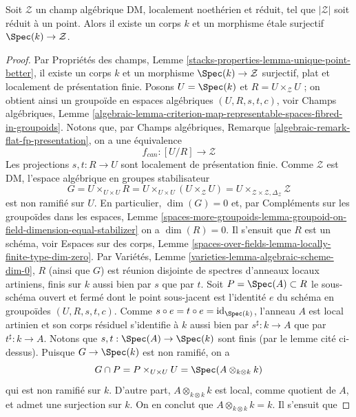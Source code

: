 \begin{lemma}
\label{lemma-DM-residual-gerbe}
Soit $\mathcal{Z}$ un champ algébrique DM, localement noethérien et réduit,
tel que $|\mathcal{Z}|$ soit réduit à un point. Alors il existe un corps $k$
et un morphisme étale surjectif $\Spec(k) \to \mathcal{Z}$.
\end{lemma}

\begin{proof}
Par Propriétés des champs,
Lemme \ref{stacks-properties-lemma-unique-point-better},
il existe un corps $k$ et un morphisme $\Spec(k) \to \mathcal{Z}$ surjectif,
plat et localement de présentation finie. Posons $U = \Spec(k)$ et
$R = U \times_\mathcal{Z} U$ ; on obtient ainsi un groupoïde en espaces
algébriques $(U, R, s, t, c)$, voir Champs algébriques, Lemme
\ref{algebraic-lemma-criterion-map-representable-spaces-fibred-in-groupoids}.
Notons que, par Champs algébriques,
Remarque \ref{algebraic-remark-flat-fp-presentation}, on a une équivalence
$$
f_{can} : [U/R] \longrightarrow \mathcal{Z}
$$
Les projections $s, t : R \to U$ sont localement de présentation finie.
Comme $\mathcal{Z}$ est DM, l'espace algébrique en groupes stabilisateur
$$
G = U \times_{U \times U} R = U \times_{U \times U} (U \times_\mathcal{Z} U) =
U \times_{\mathcal{Z} \times \mathcal{Z}, \Delta_\mathcal{Z}} \mathcal{Z}
$$
est non ramifié sur $U$. En particulier, $\dim(G) = 0$ et, par Compléments
sur les groupoïdes dans les espaces, Lemme
\ref{spaces-more-groupoids-lemma-groupoid-on-field-dimension-equal-stabilizer}
on a $\dim(R) = 0$. Il s'ensuit que $R$ est un schéma, voir Espaces sur des
corps, Lemme
\ref{spaces-over-fields-lemma-locally-finite-type-dim-zero}.
Par Variétés, Lemme \ref{varieties-lemma-algebraic-scheme-dim-0},
$R$ (ainsi que $G$) est réunion disjointe de spectres d'anneaux locaux
artiniens, finis sur $k$ aussi bien par $s$ que par $t$. Soit
$P = \Spec(A) \subset R$ le sous-schéma ouvert et fermé dont le point
sous-jacent est l'identité $e$ du schéma en groupoïdes $(U, R, s, t, c)$.
Comme $s \circ e = t \circ e = \text{id}_{\Spec(k)}$, l'anneau $A$ est local
artinien et son corps résiduel s'identifie à $k$ aussi bien par
$s^\sharp : k \to A$ que par $t^\sharp : k \to A$.
Notons que $s, t : \Spec(A) \to \Spec(k)$ sont finis (par le lemme cité
ci-dessus). Puisque $G \to \Spec(k)$ est non ramifié, on a
$$
G \cap P = P \times_{U \times U} U = \Spec(A \otimes_{k \otimes k} k)
$$
qui est non ramifié sur $k$. D'autre part,
$A \otimes_{k \otimes k} k$ est local, comme quotient de $A$, et admet une
surjection sur $k$. On en conclut que $A \otimes_{k \otimes k} k = k$. Il s'ensuit que

\end{proof}
